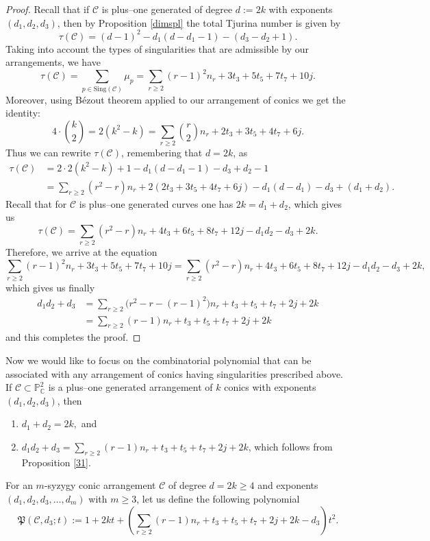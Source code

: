 \documentclass[11pt]{article}
\theoremstyle{plain}
\theoremstyle{definition}
\begin{document}
\begin{proof}
    Recall that if $\mathcal{C}$ is plus--one generated of degree $d:=2k$ with exponents $(d_1,d_2,d_3)$, then by Proposition \ref{dimspl} the total Tjurina number is given by
    $$\tau(\mathcal{C})=(d-1)^2-d_1(d-d_1-1)-(d_3-d_2+1).$$
    Taking into account the types of singularities that are admissible by our arrangements, we have $$\tau(\mathcal{C})=\sum_{p\in\text{Sing}(\mathcal{C})}\mu_p=\sum_{r\geq2}{(r-1)^2n_r}+3t_3+5t_5+7t_7+10j.$$
    Moreover, using B\'ezout theorem applied to our arrangement of conics we get the identity:
    $$4\cdot\binom{k}{2}=2(k^2-k)=\sum_{r\geq2}{\binom{r}{2}}n_r+2t_3+3t_5+4t_7+6j.$$
    Thus we can rewrite $\tau(\mathcal{C})$, remembering that $d=2k$, as
    \begin{align*}
        \tau(\mathcal{C}) &= 2\cdot 2(k^2-k)+1- d_1(d-d_1-1) - d_3+d_2-1 \\ &= \sum_{r\geq2}(r^2-r)n_r+2(2t_3+3t_5+4t_7+6j)-d_1 (d-d_{1})-d_3+(d_1+d_2).
    \end{align*}
    Recall that for $\mathcal{C}$ is plus--one generated curves one has $2k=d_1+d_2$, which gives us
    $$\tau(\mathcal{C})=\sum_{r\geq2}{(r^2-r)n_r}+4t_3+6t_5+8t_7+12j-d_1d_2-d_3+2k.$$
    Therefore, we arrive at the equation
    $$\sum_{r\geq2}{(r-1)^2n_r}+3t_3+5t_5+7t_7+10j=\sum_{r\geq2}{(r^2-r)n_r}+4t_3+6t_5+8t_7+12j-d_1d_2-d_3+2k,$$
    which gives us finally
    \begin{align*}
    d_1d_2+d_3 &= \sum_{r\geq2}{\bigg(r^2-r-(r-1)^2\bigg)n_r}+t_3+t_5+t_7+2j+2k \\
    &=\sum_{r\geq2}{(r-1)n_r}+t_3+t_5+t_7+2j+2k
    \end{align*}
and this completes the proof.
\end{proof}
Now we would like to focus on the combinatorial polynomial that can be associated with any arrangement of conics having singularities prescribed above. If $\mathcal{C}\subset\mathbb{P}^2_\mathbb{C}$ is a plus--one generated arrangement of $k$ conics with exponents $(d_1, d_2, d_3)$, then
\begin{enumerate}
    \item[1)] $d_1+d_2=2k,$ and
    \item[2)] $d_1d_2 + d_{3}=\sum_{r\geq2}{(r-1)n_r}+t_3+t_5+t_7+2j+2k$, which follows from Proposition \ref{31}.
\end{enumerate}
For an $m$-syzygy conic arrangement $\mathcal{C}$ of degree $d=2k\geq 4$ and exponents $(d_1, d_2, d_3 , \ldots , d_{m})$ with $m\geq 3$, let us define the following polynomial
$$\mathfrak{P}(\mathcal{C}, d_3; t):= 1+ 2k t+\left(\sum_{r\geq2}{(r-1)n_r}+t_3+t_5+t_7+2j+2k-d_3\right)t^2.$$
\end{document}
